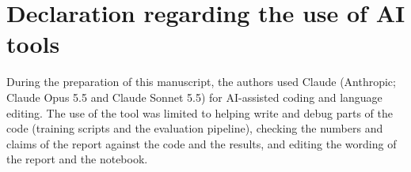 \documentclass{article}
\begin{document}
\section*{Declaration regarding the use of AI tools}
During the preparation of this manuscript, the authors used Claude (Anthropic;
Claude Opus 5.5 and Claude Sonnet 5.5) for AI-assisted coding and language
editing. The use of the tool was limited to helping write and debug parts of the
code (training scripts and the evaluation pipeline), checking the numbers and
claims of the report against the code and the results, and editing the wording
of the report and the notebook.
\end{document}
